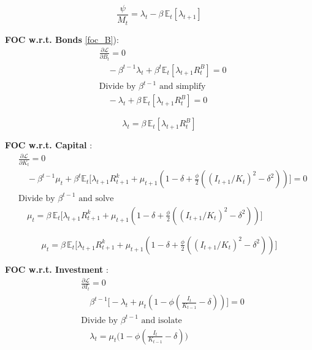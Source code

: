 \documentclass[11pt,preprint]{elsarticle}
\numberwithin{equation}{section}
\numberwithin{figure}{section}
\numberwithin{table}{section}
\begin{document}
\begin{equation}\label{foc_M}
\boxed{\frac{\psi}{M_t} = \lambda_t - \beta\,\mathbb{E}_t[\lambda_{t+1}]}
\end{equation}

\textbf{FOC w.r.t. Bonds} \eqref{foc_B}): \begin{align*}
  & \frac{\partial \mathcal{L}}{\partial B_t} = 0 \\
  & \quad -\beta^{t-1}\lambda_t + \beta^t\mathbb{E}_t[\lambda_{t+1}R^B_t] = 0 \\[6pt]
  & \text{Divide by }\beta^{t-1}\text{ and simplify} \\
  & \quad -\lambda_t + \beta\,\mathbb{E}_t[\lambda_{t+1}R^B_t] = 0
\end{align*}

\begin{equation}\label{foc_B}
\boxed{\lambda_t = \beta\,\mathbb{E}_t[\lambda_{t+1}R^B_t]}
\end{equation}

\textbf{FOC w.r.t. Capital} : \begin{align*}
  & \frac{\partial \mathcal{L}}{\partial K_t} = 0 \\
  & \quad -\beta^{t-1}\mu_t + \beta^t\mathbb{E}_t\bigl[\lambda_{t+1}R^k_{t+1} + \mu_{t+1}(1-\delta + \tfrac{\phi}{2}((I_{t+1}/K_t)^2 - \delta^2))\bigr] = 0 \\[6pt]
  & \text{Divide by }\beta^{t-1}\text{ and solve} \\
  & \quad \mu_t = \beta\,\mathbb{E}_t\bigl[\lambda_{t+1}R^k_{t+1} + \mu_{t+1}(1-\delta + \tfrac{\phi}{2}((I_{t+1}/K_t)^2 - \delta^2))\bigr]
\end{align*}

\begin{equation}\label{foc_K}
\boxed{\mu_t = \beta\,\mathbb{E}_t\bigl[\lambda_{t+1}R^k_{t+1} + \mu_{t+1}(1-\delta + \tfrac{\phi}{2}((I_{t+1}/K_t)^2 - \delta^2))\bigr]}
\end{equation}

\textbf{FOC w.r.t. Investment} : \begin{align*}
  & \frac{\partial \mathcal{L}}{\partial I_t} = 0 \\
  & \quad \beta^{t-1}\bigl[-\lambda_t + \mu_t(1 - \phi(\tfrac{I_t}{K_{t-1}} - \delta))\bigr] = 0 \\[6pt]
  & \text{Divide by }\beta^{t-1}\text{ and isolate} \\
  & \quad \lambda_t = \mu_t\bigl(1 - \phi(\tfrac{I_t}{K_{t-1}} - \delta)\bigr)
\end{align*}
\end{document}
